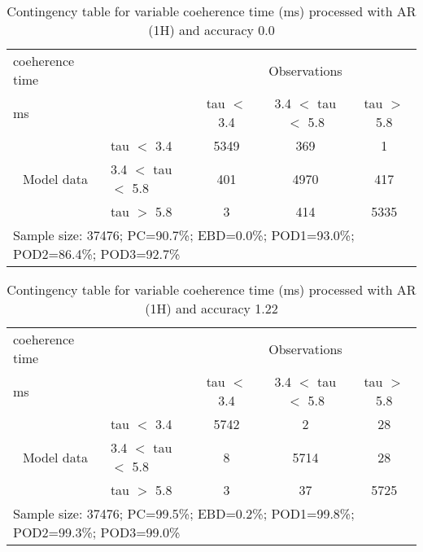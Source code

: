 \documentclass[11pt,english]{article}
\begin{document}
\begin{table}[]
\begin{center}
\begin{tabular}{llccc}
\hline
{coeherence time}                                       &                                                    & \multicolumn{3}{c}{Observations}                 \\
{ms}                                       &                             & tau $<$ 3.4   & 3.4 $<$ tau $<$ 5.8 & tau $>$ 5.8 \\
\hline
\multicolumn{1}{c}{\multirow{3}{*}{Model data}}  & tau $<$ 3.4             & 5349                & 369                       & 1              \\
                                                 & 3.4  $<$ tau $<$ 5.8 & 401                & 4970                       & 417              \\
                                                 & tau $>$ 5.8             & 3                & 414                       & 5335              \\
\hline
\multicolumn{5}{l}{Sample size: 37476; PC=90.7\%; EBD=0.0\%; POD1=93.0\%; POD2=86.4\%; POD3=92.7\%}
\end{tabular}
\end{center}
\caption{Contingency table for variable coeherence time (ms) processed with AR (1H) and accuracy 0.0}
\label{tab:contingencytauAFT}
\end{table}
\begin{table}[]
\begin{center}
\begin{tabular}{llccc}
\hline
{coeherence time}                                       &                                                    & \multicolumn{3}{c}{Observations}                 \\
{ms}                                       &                             & tau $<$ 3.4   & 3.4 $<$ tau $<$ 5.8 & tau $>$ 5.8 \\
\hline
\multicolumn{1}{c}{\multirow{3}{*}{Model data}}  & tau $<$ 3.4             & 5742                & 2                       & 28              \\
                                                 & 3.4  $<$ tau $<$ 5.8 & 8                & 5714                       & 28              \\
                                                 & tau $>$ 5.8             & 3                & 37                       & 5725              \\
\hline
\multicolumn{5}{l}{Sample size: 37476; PC=99.5\%; EBD=0.2\%; POD1=99.8\%; POD2=99.3\%; POD3=99.0\%}
\end{tabular}
\end{center}
\caption{Contingency table for variable coeherence time (ms) processed with AR (1H) and accuracy 1.22}
\label{tab:contingencytauAFT}
\end{table}
\end{document}
